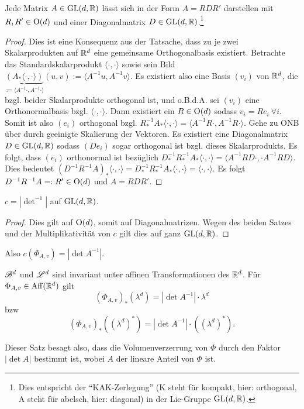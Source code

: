 \begin{satz}
Jede Matrix $A\in \operatorname{GL}(d,\mathbb{R})$ lässt sich in der Form $A=RDR'$ darstellen mit $R,R'\in \operatorname{O}(d)$ und einer Diagonalmatrix $D\in \operatorname{GL}(d,\mathbb{R})$.\footnote{Dies entspricht der ``KAK-Zerlegung'' (K steht für kompakt, hier: orthogonal, A steht für abelsch, hier: diagonal) in der Lie-Gruppe $\operatorname{GL}(d,\mathbb{R})$.}
\begin{proof}
Dies ist eine Konsequenz aus der Tatsache, dass zu je zwei Skalarprodukten auf $\mathbb{R}^d$ eine gemeinsame Orthogonalbasis existiert. Betrachte das Standardskalarprodukt $\langle \cdot, \cdot \rangle$ sowie sein Bild $\underbrace{(A_* \langle \cdot, \cdot \rangle)}_{:= \langle A^{-1} \cdot ,A^{-1}\cdot \rangle}(u,v):= \langle A^{-1}u, A^{-1}v \rangle$. Es existiert also eine Basis $(v_i)$ von $\mathbb{R}^d$, die bzgl. beider Skalarprodukte orthogonal ist, und o.B.d.A. sei $(v_i)$ eine Orthonormalbasis bzgl. $\langle \cdot, \cdot \rangle$. Dann existiert ein $R \in \operatorname{O}(d)$ sodass $v_i = R e_i \ \forall i$.  Somit ist also $(e_i)$ orthogonal bzgl. $R^{-1}_*A_*\langle \cdot, \cdot \rangle = \langle A^{-1}R\cdot,A^{-1}R\cdot\rangle$. Gehe zu ONB über durch geeinigte Skalierung der Vektoren. Es existiert eine Diagonalmatrix $D\in \operatorname{GL} (d,\mathbb{R})$ sodass $(De_i)$ sogar orthogonal ist bzgl. dieses Skalarprodukts. Es folgt, dass $(e_i)$ orthonormal ist bezüglich $D^{-1}_* R^{-1}_* A_* \langle \cdot , \cdot \rangle = \langle A^{-1} RD\cdot ,\cdot A^{-1} RD\rangle$. Dies bedeutet $(D^{-1}R^{-1}A)_*\langle \cdot ,\cdot \rangle=D^{-1}_* R^{-1}_* A_* \langle \cdot ,\cdot \rangle = \langle \cdot, \cdot \rangle$. Es folgt $D^{-1}R^{-1}A =: R' \in \operatorname{O}(d)$ und $A=RDR'$.
\end{proof}
\end{satz}

\begin{korollar}
$c= |\det^{-1}|$ auf $\operatorname{GL}(d,\mathbb{R})$.
\begin{proof}
Dies gilt auf $\operatorname{O}(d)$, somit auf Diagonalmatrizen. Wegen des beiden Satzes und der Multiplikativität von $c$ gilt dies auf ganz $\operatorname{GL}(d,\mathbb{R})$.
\end{proof}
Also $c(\Phi_{A,v})=|\det A^{-1}|$.
\end{korollar}

\begin{satz}\label{skalierung-leb}
\begin{mdframed}
$\mathscr{B}^d$ und $\mathscr{L}^d$ sind invariant unter affinen Transformationen des $\mathbb{R}^d$. Für $\Phi_{A,v} \in \operatorname{Aff}(\mathbb{R}^d)$ gilt
$$
(\Phi_{A,v})_*(\lambda^d)=|\det A^{-1}|\cdot \lambda^d
$$
bzw
$$
(\Phi_{A,v})_*((\lambda^d)^*)=|\det A^{-1}|\cdot ((\lambda^d)^*).
$$
\end{mdframed}
Dieser Satz besagt also, dass die Volumenverzerrung von $\Phi$ durch den Faktor $|\det A|$ bestimmt ist, wobei $A$ der lineare Anteil von $\Phi$ ist.
\end{satz}



